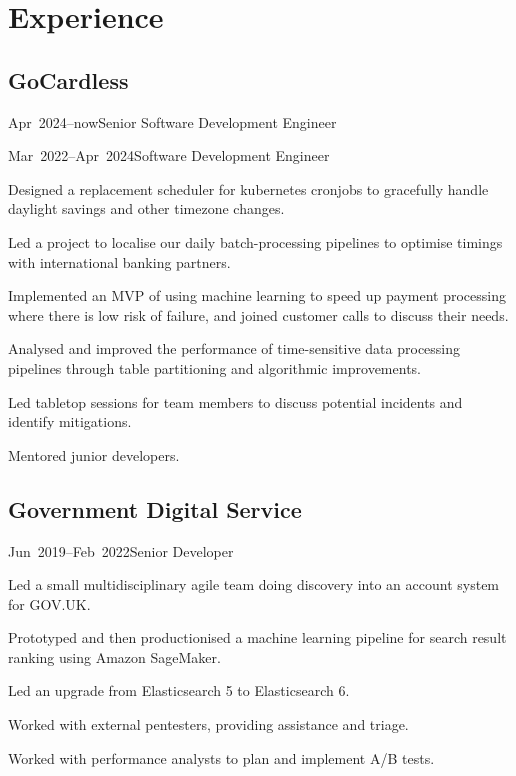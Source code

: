 \documentclass[a4paper]{barrucadu-cv}
\newcommand{\range}[2]{#1–#2}
\newcommand{\orange}[1]{\range{#1}{now}}
\begin{document}
\section{Experience}

\subsection{GoCardless}
\begin{cventry}{\orange{Apr~2024}}{Senior Software Development Engineer}
\end{cventry}

\begin{cventry}{\range{Mar~2022}{Apr~2024}}{Software Development Engineer}
  \begin{tightitemize}
  \item Designed a replacement scheduler for kubernetes cronjobs to gracefully handle daylight savings and other timezone changes.
  \item Led a project to localise our daily batch-processing pipelines to optimise timings with international banking partners.
  \item Implemented an MVP of using machine learning to speed up payment processing where there is low risk of failure, and joined customer calls to discuss their needs.
  \item Analysed and improved the performance of time-sensitive data processing pipelines through table partitioning and algorithmic improvements.
  \item Led tabletop sessions for team members to discuss potential incidents and identify mitigations.
  \item Mentored junior developers.
  \end{tightitemize}
\end{cventry}

\subsection{Government Digital Service}

\begin{cventry}{\range{Jun~2019}{Feb~2022}}{Senior Developer}
  \begin{tightitemize}
  \item Led a small multidisciplinary agile team doing discovery into an account system for GOV.UK.
  \item Prototyped and then productionised a machine learning pipeline for search result ranking using Amazon SageMaker.
  \item Led an upgrade from Elasticsearch 5 to Elasticsearch 6.
  \item Worked with external pentesters, providing assistance and triage.
  \item Worked with performance analysts to plan and implement A/B tests.
  \end{tightitemize}
\end{cventry}
\end{document}
